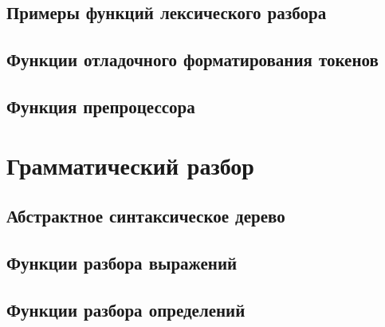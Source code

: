 \subsection*{Примеры функций лексического разбора}


\subsection*{Функции отладочного форматирования токенов}



\subsection*{Функция препроцессора}



\section*{Грамматический разбор}
\subsection*{Абстрактное синтаксическое дерево}


\subsection*{Функции разбора выражений}


\subsection*{Функции разбора определений}


% 

